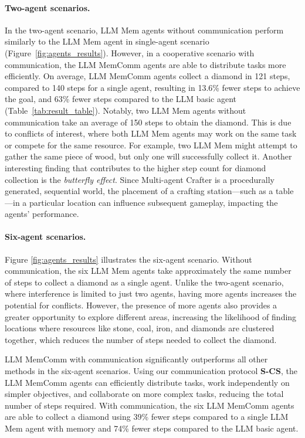 \paragraph{\textbf{Two-agent scenarios.}} In the two-agent scenario, LLM Mem agents without communication perform similarly to the LLM Mem agent in single-agent scenario (Figure~\ref{fig:agents_results}). However, in a cooperative scenario with communication, the LLM MemComm agents are able to distribute tasks more efficiently. On average, LLM MemComm agents collect a diamond in 121 steps, compared to 140 steps for a single agent, resulting in 13.6\% fewer steps to achieve the goal, and 63\% fewer steps compared to the LLM basic agent (Table~\ref{tab:result_table}). Notably, two LLM Mem agents without communication take an average of 150 steps to obtain the diamond. This is due to conflicts of interest, where both LLM Mem agents may work on the same task or compete for the same resource. For example, two LLM Mem might attempt to gather the same piece of wood, but only one will successfully collect it. Another interesting finding that contributes to the higher step count for diamond collection is the \textit{butterfly effect}. Since Multi-agent Crafter is a procedurally generated, sequential world, the placement of a crafting station—such as a table—in a particular location can influence subsequent gameplay, impacting the agents' performance.

\paragraph{\textbf{Six-agent scenarios.}} Figure \ref{fig:agents_results} illustrates the six-agent scenario. Without communication, the six LLM Mem agents take approximately the same number of steps to collect a diamond as a single agent. Unlike the two-agent scenario, where interference is limited to just two agents, having more agents increases the potential for conflicts. However, the presence of more agents also provides a greater opportunity to explore different areas, increasing the likelihood of finding locations where resources like stone, coal, iron, and diamonds are clustered together, which reduces the number of steps needed to collect the diamond. 

LLM MemComm with communication significantly outperforms all other methods in the six-agent scenarios. Using our communication protocol \textbf{S-CS}, the LLM MemComm agents can efficiently distribute tasks, work independently on simpler objectives, and collaborate on more complex tasks, reducing the total number of steps required. With communication, the six LLM MemComm agents are able to collect a diamond using 39\% fewer steps compared to a single LLM Mem agent with memory and 74\% fewer steps compared to the LLM basic agent.


